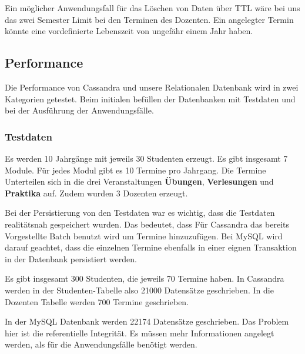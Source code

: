 \vspace{6pt}

Ein möglicher Anwendungsfall für das Löschen von Daten über TTL wäre bei uns das zwei Semester Limit bei den Terminen des Dozenten. Ein angelegter Termin könnte eine vordefinierte Lebenszeit von ungefähr einem Jahr haben.

\newpage

\subsection{Performance}
Die Performance von Cassandra und unsere Relationalen Datenbank wird in zwei Kategorien getestet. Beim initialen befüllen der Datenbanken mit Testdaten und bei der Ausführung der Anwendungsfälle.

\vspace{12pt}

\subsubsection{Testdaten}
Es werden 10 Jahrgänge mit jeweils 30 Studenten erzeugt. Es gibt insgesamt 7 Module. Für jedes Modul gibt es 10 Termine pro Jahrgang. Die Termine Unterteilen sich in die drei Veranstaltungen \textbf{Übungen}, \textbf{Verlesungen} und \textbf{Praktika} auf. Zudem wurden 3 Dozenten erzeugt.

\vspace{6pt}

Bei der Persistierung von den Testdaten war es wichtig, dass die Testdaten realitätsnah gespeichert wurden. Das bedeutet, dass Für Cassandra das bereits Vorgestellte Batch benutzt wird um Termine hinzuzufügen. Bei MySQL wird darauf geachtet, dass die einzelnen Termine ebenfalls in einer eignen Transaktion in der Datenbank persistiert werden.

\vspace{6pt}

Es gibt insgesamt 300 Studenten, die jeweils 70 Termine haben. In Cassandra werden in der Studenten-Tabelle also 21000 Datensätze geschrieben. In die Dozenten Tabelle werden 700 Termine geschrieben.

\vspace{6pt}

In der MySQL Datenbank werden 22174 Datensätze geschrieben. Das Problem hier ist die referentielle Integrität. Es müssen mehr Informationen angelegt werden, als für die Anwendungsfälle benötigt werden.

\vspace{6pt}

